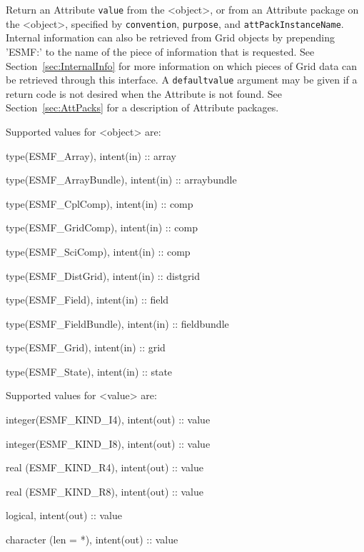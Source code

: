    Return an Attribute {\tt value} from the <object>, or from an Attribute
   package on the <object>, specified by {\tt convention},
   {\tt purpose}, and {\tt attPackInstanceName}. Internal information can also
   be retrieved from Grid objects by prepending 'ESMF:' to the name of the
   piece of information that is requested. See
   Section~\ref{sec:InternalInfo} for more information
   on which pieces of Grid data can be retrieved through this interface.
   A {\tt defaultvalue} argument
   may be given if a return code is not desired when the Attribute is not
   found. See Section~\ref{sec:AttPacks} for a description of Attribute
   packages.
  
   Supported values for <object> are:
   \begin{description}
   \item type(ESMF\_Array), intent(in) :: array
   \item type(ESMF\_ArrayBundle), intent(in) :: arraybundle
   \item type(ESMF\_CplComp), intent(in) :: comp
   \item type(ESMF\_GridComp), intent(in) :: comp
   \item type(ESMF\_SciComp), intent(in) :: comp
   \item type(ESMF\_DistGrid), intent(in) :: distgrid
   \item type(ESMF\_Field), intent(in) :: field
   \item type(ESMF\_FieldBundle), intent(in) :: fieldbundle
   \item type(ESMF\_Grid), intent(in) :: grid
   \item type(ESMF\_State), intent(in) :: state
   \end{description}
  
   Supported values for <value> are:
   \begin{description}
   \item integer(ESMF\_KIND\_I4), intent(out) :: value
   \item integer(ESMF\_KIND\_I8), intent(out) :: value
   \item real (ESMF\_KIND\_R4), intent(out) :: value
   \item real (ESMF\_KIND\_R8), intent(out) :: value
   \item logical, intent(out) :: value
   \item character (len = *), intent(out) :: value
   \end{description}
  
